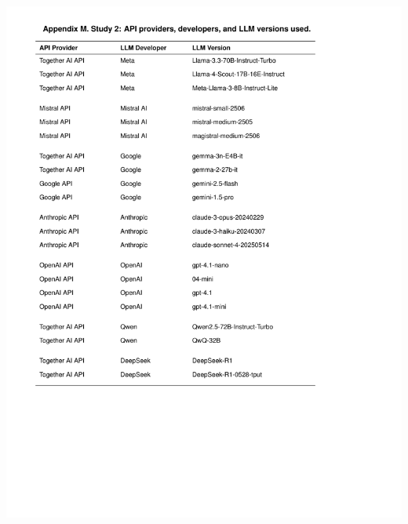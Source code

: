 \documentclass[
  12pt,
]{article}
\begin{document}
\begin{center}\includegraphics{../03_outputs/04_appendices/appendix_m} \end{center}
\end{document}
